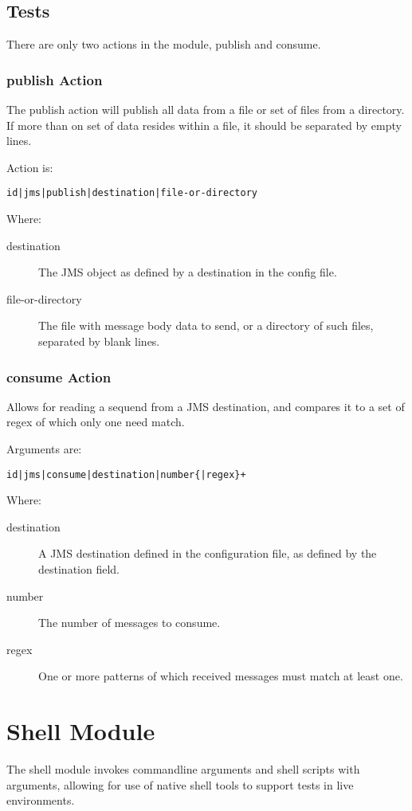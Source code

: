 \documentclass[12pt,a4paper,koma]{article}
\begin{document}
\subsection{Tests}
\label{sec-4-2}
There are only two actions in the module, publish and consume.

\subsubsection{publish Action}
\label{sec-4-2-1}

The publish action will publish all data from a file or set of files from
a directory. If more than on set of data resides within a file, it should
be separated by empty lines.

Action is:
\begin{verbatim}
id|jms|publish|destination|file-or-directory
\end{verbatim}

Where:
\begin{description}
\item[{destination}] The JMS object as defined by a destination in the config file.
\item[{file-or-directory}] The file with message body data to send, or a directory
of such files, separated by blank lines.
\end{description}
\subsubsection{consume Action}
\label{sec-4-2-2}
Allows for reading a sequend from a JMS destination, and compares it to a
set of regex of which only one need match.

Arguments are:
\begin{verbatim}
id|jms|consume|destination|number{|regex}+
\end{verbatim}

Where:
\begin{description}
\item[{destination}] A JMS destination defined in the configuration file,
as defined by the destination field.
\item[{number}] The number of messages to consume.
\item[{regex}] One or more patterns of which received messages must match at
least one.
\end{description}
\section{Shell Module}
\label{sec-5}
The shell module invokes commandline arguments and shell scripts with
arguments, allowing for use of native shell tools to support tests in live
environments.
\end{document}
